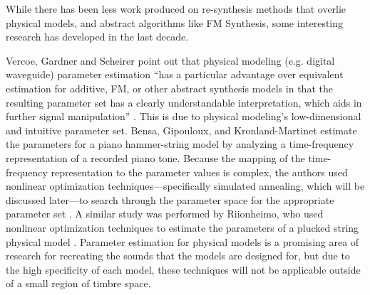 \documentclass[12pt]{report} 	%
\numberwithin{figure}{chapter}
\numberwithin{table}{chapter}
\numberwithin{equation}{chapter}
\begin{document}
\begin{flushleft}
While there has been less work produced on re-synthesis methods that overlie physical models, and abstract algorithms like FM Synthesis, some interesting research has developed in the last decade.

Vercoe, Gardner and Scheirer point out that physical modeling (e.g. digital waveguide) parameter estimation ``has a particular advantage over equivalent estimation for additive, FM, or other abstract synthesis models in that the resulting parameter set has a clearly understandable interpretation, which aids in further signal manipulation'' \cite[p. 11]{Vercoe:1998hh}. This is due to physical modeling's low-dimensional and intuitive parameter set. Bensa, Gipouloux, and Kronland-Martinet estimate the parameters for a piano hammer-string model by analyzing a time-frequency representation of a recorded piano tone. Because the mapping of the time-frequency representation to the parameter values is complex, the authors used nonlinear optimization techniques---specifically simulated annealing, which will be discussed later---to search through the parameter space for the appropriate parameter set \cite[p. 499]{Bensa:2005xq}. A similar study was performed by Riionheimo, who used nonlinear optimization techniques to estimate the parameters of a plucked string physical model \cite{Riionheimo:2003qo}. Parameter estimation for physical models is a promising area of research for recreating the sounds that the models are designed for, but due to the high specificity of each model, these techniques will not be applicable outside of a small region of timbre space.


\end{flushleft}
\end{document}
